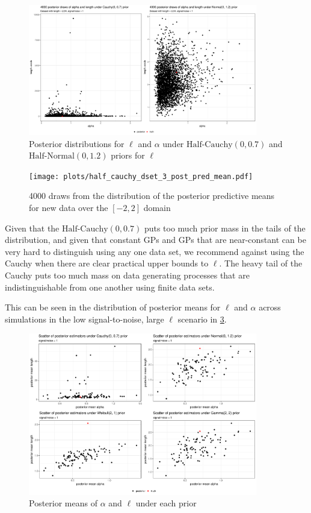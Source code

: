 \documentclass{article}
\begin{document}
\begin{figure}[h] \label{gp_set_3_len}
  \centering
  \includegraphics[width=100mm]{plots/dset_3_length_alpha.pdf}
  \caption{Posterior distributions for $\ell$ and $\alpha$ under
  $\text{Half-Cauchy}(0, 0.7)$ and $\text{Half-Normal}(0, 1.2)$ priors for $\ell$}
\end{figure}

\begin{figure}[h] \label{gp_set_3_post_pred_cauchy}
  \centering
  \texttt{[image: plots/half\_cauchy\_dset\_3\_post\_pred\_mean.pdf]}
  \caption{4000 draws from the distribution of the posterior predictive means for new data over the $[-2,2]$ domain}
\end{figure}

Given that the $\text{Half-Cauchy}(0, 0.7)$ puts too much prior mass in the
tails of the distribution, and given that constant GPs and GPs that are
near-constant can be very hard to distinguish using any one data set, we
recommend against using the Cauchy when there are clear practical upper bounds
to $\ell$. The heavy tail of the Cauchy puts too much mass on data generating
processes that are indistinguishable from one another using finite data sets.

This can be seen in the distribution of posterior means for $\ell$ and $\alpha$
across simulations in the low signal-to-noise, large $\ell$ scenario in \ref{joint_len_alpha}. 

\begin{figure}[h] \label{joint_len_alpha}
  \centering
  \includegraphics[width=100mm]{plots/dsets_2_5_alpha_0_7_alpha_length.pdf}
  \caption{Posterior means of $\alpha$ and $\ell$ under each prior}
\end{figure}
\end{document}
